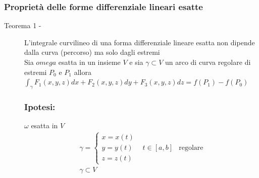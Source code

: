 \documentclass{book}
\begin{document}
\subsubsection{Proprietà delle forme differenziale lineari esatte}
\begin{description}
	\item[Teorema 1 -] L'integrale curvilineo di una forma differenziale
		lineare esatta non dipende dalla curva (percorso) ma solo dagli
		estremi\\
		Sia $omega$ esatta in un insieme $V$ e sia $\gamma \subset V$ un arco di
		curva regolare di estremi $P_0$ e $P_1$ allora $\displaystyle\int_\gamma
		F_1(x,y,z)dx + F_2(x,y,z) dy+ F_3(x,y,z)dz=f(P_1)-f(P_0)$
		\begin{multicols}{2}
			\subsubsection{Ipotesi:}
			$\omega$ esatta in $V$
			\begin{eqnarray*}
				\gamma=\begin{cases}
					x=x(t) \\
					y=y(t)\\
					z=z(t)
				\end{cases} & t\in[a,b] &\text{regolare}\\
				\gamma \subset V
			\end{eqnarray*}

\end{multicols}
\end{description}
\end{document}
